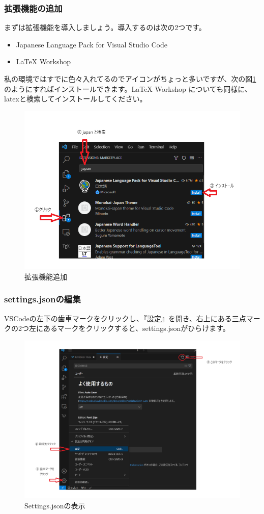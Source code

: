 \documentclass[uplatex,dvipdfmx]{jsarticle}
\numberwithin{equation}{section}
\begin{document}
\subsubsection{拡張機能の追加}
まずは拡張機能を導入しましょう。導入するのは次の2つです。
\begin{itemize}
  \item Japanese Language Pack for Visual Studio Code
  \item LaTeX Workshop
\end{itemize}
私の環境ではすでに色々入れてるのでアイコンがちょっと多いですが、次の図\ref{fig:kakutyou}のようにすればインストールできます。LaTeX Workshop についても同様に、latexと検索してインストールしてください。
\begin{figure}[htbp]
  \centering
  \includegraphics[width=0.7\linewidth]{kakutyou.png}
  \caption{拡張機能追加}
  \label{fig:kakutyou}
\end{figure}
\subsubsection{settings.jsonの編集}
VSCodeの左下の歯車マークをクリックし、『設定』を開き、右上にある三点マークの2つ左にあるマークをクリックすると、settings.jsonがひらけます。
\begin{figure}[htbp]
  \centering
  \includegraphics[width=0.7\linewidth]{Setting.png}
  \caption{Settings.jsonの表示}
  \label{fig:settings}
\end{figure}
\end{document}

